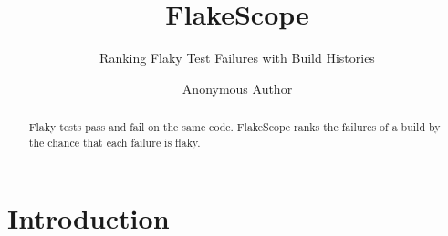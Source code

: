 \documentclass[acmsmall,screen]{acmart}
\begin{document}
\title{FlakeScope}
\subtitle{Ranking Flaky Test Failures with Build Histories}
\author{Anonymous Author}
\begin{abstract}
Flaky tests pass and fail on the same code. FlakeScope ranks the failures of a build by the chance that each failure
is flaky.
\end{abstract}
\maketitle
\section{Introduction}
\lipsum[1-2]
\end{document}
